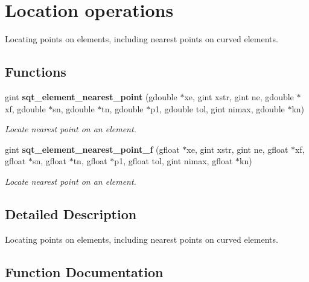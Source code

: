 \section{Location operations}
\label{group__location}


Locating points on elements, including nearest points on curved elements.  


\subsection*{Functions}
\begin{DoxyCompactItemize}
\item 
gint {\bf sqt\+\_\+element\+\_\+nearest\+\_\+point} (gdouble $\ast$xe, gint xstr, gint ne, gdouble $\ast$xf, gdouble $\ast$sn, gdouble $\ast$tn, gdouble $\ast$p1, gdouble tol, gint nimax, gdouble $\ast$kn)
\begin{DoxyCompactList}\small\item\em Locate nearest point on an element. \end{DoxyCompactList}\item 
gint {\bf sqt\+\_\+element\+\_\+nearest\+\_\+point\+\_\+f} (gfloat $\ast$xe, gint xstr, gint ne, gfloat $\ast$xf, gfloat $\ast$sn, gfloat $\ast$tn, gfloat $\ast$p1, gfloat tol, gint nimax, gfloat $\ast$kn)
\begin{DoxyCompactList}\small\item\em Locate nearest point on an element. \end{DoxyCompactList}\end{DoxyCompactItemize}


\subsection{Detailed Description}
Locating points on elements, including nearest points on curved elements. 



\subsection{Function Documentation}
